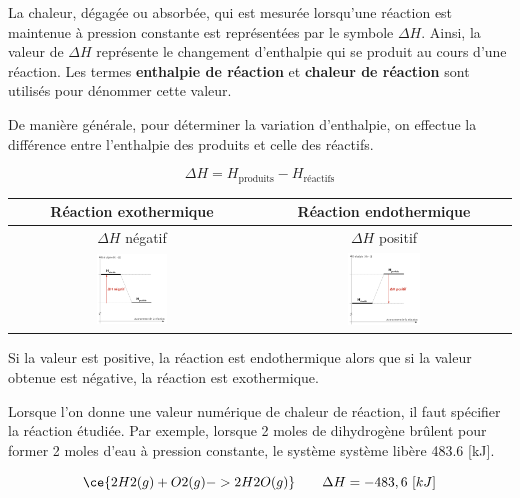 \documentclass[
  11pt,
  french,
  a4paper,
  openany]{book}
\begin{document}
La chaleur, dégagée ou absorbée, qui est mesurée lorsqu'une réaction est maintenue à pression constante est représentées par le symbole \(\Delta H\). Ainsi, la valeur de \(\Delta H\) représente le changement d'enthalpie qui se produit au cours d'une réaction. Les termes \textbf{enthalpie de réaction} et \textbf{chaleur de réaction} sont utilisés pour dénommer cette valeur.

De manière générale, pour déterminer la variation d'enthalpie, on effectue la différence entre l'enthalpie des produits et celle des réactifs.

\[
\Delta H = H _{\text{produits}} − H _{\text{réactifs}}
\]

\begin{longtable}[]{@{}cc@{}}
\toprule
Réaction exothermique & Réaction endothermique\tabularnewline
\midrule
\endhead
\(\Delta H\) négatif & \(\Delta H\) positif\tabularnewline
\includegraphics[width=0.3\textwidth,height=\textheight]{images/enthalpie-1-exo.png} & \includegraphics[width=0.3\textwidth,height=\textheight]{images/enthalpie-1-endo.png}\tabularnewline
\bottomrule
\end{longtable}

Si la valeur est positive, la réaction est endothermique alors que si la valeur obtenue est négative, la réaction est exothermique.

Lorsque l'on donne une valeur numérique de chaleur de réaction, il faut spécifier la réaction étudiée. Par exemple, lorsque 2 moles de dihydrogène brûlent pour former 2 moles d'eau à pression constante, le système système libère 483.6 {[}kJ{]}.

\[
\ce{2 H2(g) + O2(g) -> 2 H2O(g) } \qquad \Delta H = -483,6\ [kJ]
\]
\end{document}
